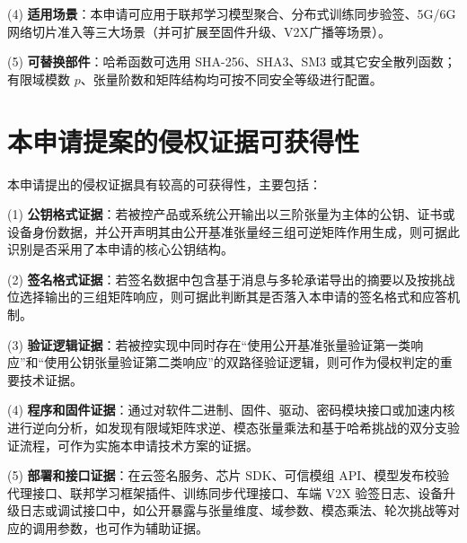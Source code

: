 \documentclass[12pt,a4paper]{article}
\begin{document}
(4) \textbf{适用场景}：本申请可应用于联邦学习模型聚合、分布式训练同步验签、5G/6G网络切片准入等三大场景（并可扩展至固件升级、V2X广播等场景）。

(5) \textbf{可替换部件}：哈希函数可选用 SHA-256、SHA3、SM3 或其它安全散列函数；有限域模数 $p$、张量阶数和矩阵结构均可按不同安全等级进行配置。

\section{本申请提案的侵权证据可获得性}

本申请提出的侵权证据具有较高的可获得性，主要包括：

(1) \textbf{公钥格式证据}：若被控产品或系统公开输出以三阶张量为主体的公钥、证书或设备身份数据，并公开声明其由公开基准张量经三组可逆矩阵作用生成，则可据此识别是否采用了本申请的核心公钥结构。

(2) \textbf{签名格式证据}：若签名数据中包含基于消息与多轮承诺导出的摘要以及按挑战位选择输出的三组矩阵响应，则可据此判断其是否落入本申请的签名格式和应答机制。

(3) \textbf{验证逻辑证据}：若被控实现中同时存在“使用公开基准张量验证第一类响应”和“使用公钥张量验证第二类响应”的双路径验证逻辑，则可作为侵权判定的重要技术证据。

(4) \textbf{程序和固件证据}：通过对软件二进制、固件、驱动、密码模块接口或加速内核进行逆向分析，如发现有限域矩阵求逆、模态张量乘法和基于哈希挑战的双分支验证流程，可作为实施本申请技术方案的证据。

(5) \textbf{部署和接口证据}：在云签名服务、芯片 SDK、可信模组 API、模型发布校验代理接口、联邦学习框架插件、训练同步代理接口、车端 V2X 验签日志、设备升级日志或调试接口中，如公开暴露与张量维度、域参数、模态乘法、轮次挑战等对应的调用参数，也可作为辅助证据。
\end{document}
